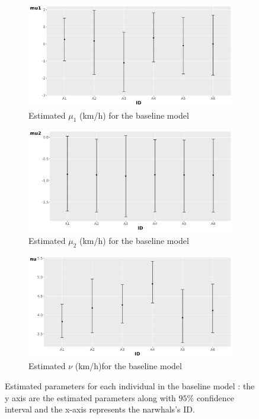 \documentclass[11pt]{article}
\newcommand {\1}{\mathbb{1}}
\begin{document}
\begin{figure}[H]
    \centering
  
    \begin{subfigure}{0.49\textwidth}
    \includegraphics[scale=0.3]{images/unconstrained_models/baseline/re_baseline2_mu1.png}
    \caption{Estimated $\mu_1$ (km/h) for the baseline model}
    \label{fig: re_baseline1_mu1}
    \end{subfigure}
     \begin{subfigure}{0.49\textwidth}
    \includegraphics[scale=0.3]{images/unconstrained_models/baseline/re_baseline2_mu2.png}
    \caption{Estimated $\mu_2$ (km/h) for the baseline model}
    \label{fig: re_baseline1_mu2}
    \end{subfigure}
  	\begin{subfigure}{0.49\textwidth}
	\includegraphics[scale=0.3]{images/unconstrained_models/baseline/re_baseline2_nu.png}
	\caption{Estimated $\nu$ (km/h)for the baseline model}
	\label{fig: re_baseline1_tau}
	\end{subfigure}
    \caption{Estimated parameters for each individual in the baseline model : the y axis are the estimated parameters along with $95 \%$ confidence interval and the x-axis represents the narwhals's ID.}
    \label{fig: constraints free baseline estimates}
\end{figure}
\end{document}
